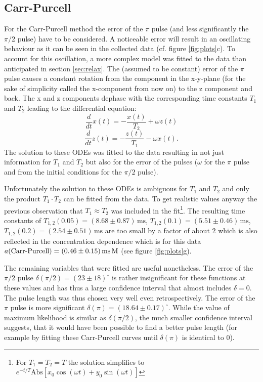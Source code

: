 \documentclass[a4paper]{scrartcl}
\numberwithin{equation}{section}
\numberwithin{figure}{section}
\numberwithin{table}{section}
\newcommand{\eq}[2]{\begin{equation}#1\label{#2}\end{equation}}
\begin{document}
\subsection{Carr-Purcell}
For the Carr-Purcell method the error of the $\pi$ pulse (and less significantly the $\pi/2$ pulse) have to be considered. A noticeable error will result in an oscillating behaviour as it can be seen in the collected data (cf. figure \ref{fig:plots}c). To account for this oscillation, a more complex model was fitted to the data than anticipated in section \ref{sec:relax}. The (assumed to be constant) error of the $\pi$ pulse causes a constant rotation from the component in the x-y-plane (for the sake of simplicity called the x-component from now on) to the z component and back. The x and z components dephase with the corresponding time constants $T_1$ and $T_2$ leading to the differential equation:
\eq{\frac{d}{dt}x(t) = -\frac{x(t)}{T_2} + \omega z(t)}{}
\eq{\frac{d}{dt}z(t) = -\frac{z(t)}{T_1} - \omega x(t) .}{}
The solution to these ODEs was fitted to the data resulting in not just information for $T_1$ and $T_2$ but also for the error of the pulses ($\omega$ for the $\pi$ pulse and from the initial conditions for the $\pi/2$ pulse).

Unfortunately the solution to these ODEs is ambiguous for $T_1$ and $T_2$ and only the product $T_1 \cdot T_2$ can be fitted from the data. To get realistic values anyway the previous observation that $T_1 \approx T_2$ was included in the fit\footnote{For $T_1=T_2=T$ the solution simplifies to $e^{-t/T} \text{Abs}[x_0 \cos(\omega t)+y_0 \sin(\omega t)]$}. The resulting time constants of $T_{1,2}(0.05)=(8.68\pm0.87)\,\text{ms}$, $T_{1,2}(0.1)=(5.51\pm 0.46)\,\text{ms}$, $T_{1,2}(0.2)=(2.54\pm 0.51)\,\text{ms}$ are too small by a factor of about 2 which is also reflected in the concentration dependence which is for this data $a(\text{Carr-Purcell})=(0.46\pm 0.15)\,\text{ms\,M}$ (see figure \ref{fig:plots}g).%

The remaining variables that were fitted are useful nonetheless. The error of the $\pi/2$ pulse $\delta(\pi/2) = (23 \pm 18)^\circ$ is rather insignificant for these functions at these values and has thus a large confidence interval that almost includes $\delta = 0$. The pulse length was thus chosen very well even retrospectively. The error of the $\pi$ pulse is more significant $\delta(\pi)=(18.64\pm 0.17)^\circ$. While the value of maximum likelihood is similar as $\delta(\pi/2)$, the much smaller confidence interval suggests, that it would have been possible to find a better pulse length (for example by fitting these Carr-Purcell curves until $\delta(\pi)$ is identical to 0). 
\end{document}
